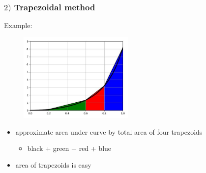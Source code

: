 \documentclass[english,14pt]{beamer}
\newcommand\red[1]{{\color{red} #1}}
\newcommand\blue[1]{{\color{blue} #1}}
\newcommand\darkGreen[1]{{\color{darkGreen} #1}}
\begin{document}
\begin{frame}[fragile]

\frametitle{$2)$ Trapezoidal method}

Example:
\vspace*{-5mm}
\begin{figure}[ht]
	\centering
	\includegraphics[width=0.5\textwidth]{figures/fourPanel}
\end{figure}
\vspace*{-3mm}
\begin{itemize}
	\item approximate area under curve by total area of four trapezoids
	\begin{itemize}
		\item black + \darkGreen{green} + \red{red} + \blue{blue}
	\end{itemize}
	\item area of trapezoids is easy %
\end{itemize}



\end{frame}

\end{document}
